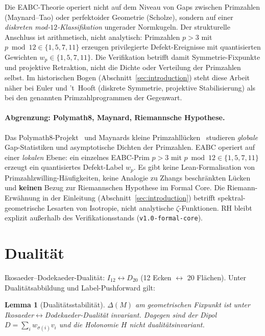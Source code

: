 \documentclass[11pt,a4paper]{article}
\newtheorem{lemma}{Lemma}
\begin{document}
	Die EABC-Theorie operiert nicht auf dem Niveau von Gaps zwischen Primzahlen
	(Maynard--Tao) oder perfektoider Geometrie (Scholze), sondern auf einer
	\emph{diskreten mod-$12$-Klassifikation} ungerader Normkugeln.
	Der strukturelle Anschluss ist arithmetisch, nicht analytisch:
	Primzahlen $p>3$ mit $p\bmod 12\in\{1,5,7,11\}$ erzeugen privilegierte
	Defekt-Ereignisse mit quantisierten Gewichten $w_p\in\{1,5,7,11\}$.
	Die Verifikation betrifft damit Symmetrie-Fixpunkte und projektive Retraktion,
	nicht die Dichte oder Verteilung der Primzahlen selbst.
	Im historischen Bogen (Abschnitt~\ref{sec:introduction}) steht diese Arbeit
	näher bei Euler und 't~Hooft (diskrete Symmetrie, projektive Stabilisierung)
	als bei den genannten Primzahlprogrammen der Gegenwart.
	
	\paragraph{Abgrenzung: Polymath8, Maynard, Riemannsche Hypothese.}
	Das Polymath8-Projekt~\cite{zhang-polymath8} und Maynards kleine Primzahllücken~\cite{maynard-gaps}
	studieren \emph{globale} Gap-Statistiken und asymptotische Dichten der Primzahlen.
	EABC operiert auf einer \emph{lokalen} Ebene: ein einzelnes EABC-Prim $p>3$ mit
	$p\bmod 12\in\{1,5,7,11\}$ erzeugt ein quantisiertes Defekt-Label $w_p$.
	Es gibt keine Lean-Formalisation von Primzahlzwilling-Häufigkeiten,
	keine Analogie zu Zhangs beschränkten Lücken und \textbf{keinen} Bezug zur
	Riemannschen Hypothese im Formal Core.
	Die Riemann-Erwähnung in der Einleitung (Abschnitt~\ref{sec:introduction}) betrifft
	spektral-geometrische Lesarten von Isotropie, nicht analytische $\zeta$-Funktionen.
	RH bleibt explizit außerhalb des Verifikationsstands (\texttt{v1.0-formal-core}).
	
	\section{Dualität}
	
	Ikosaeder--Dodekaeder-Dualität: $I_{12}\leftrightarrow D_{20}$ (12 Ecken $\leftrightarrow$ 20 Flächen).
	Unter Dualitätsabbildung und Label-Pushforward gilt:
	
	\begin{lemma}[Dualitätsstabilität]
		$\Delta(M)$ am geometrischen Fixpunkt ist unter Ikosaeder$\leftrightarrow$Dodekaeder-Dualität
		invariant. Dagegen sind der Dipol $D=\sum_i w_{\sigma(i)} v_i$ und die Holonomie $H$
		\emph{nicht} dualitätsinvariant.
	\end{lemma}
	
\end{document}
